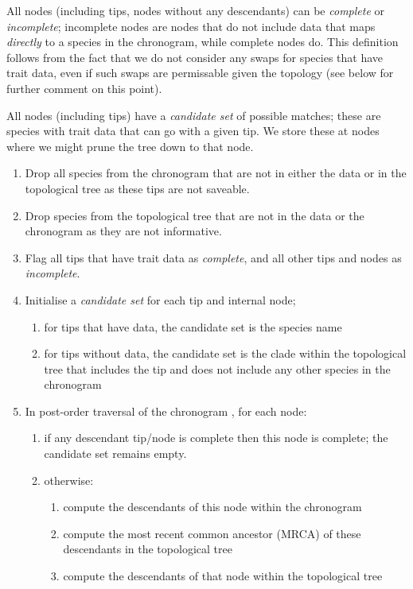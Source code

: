 \documentclass[a4paper,11pt]{article}
\begin{document}
All nodes (including tips, nodes without any descendants) can be \emph{complete} or \emph{incomplete}; incomplete nodes are nodes that do not include data that maps \emph{directly} to a species in the chronogram, while complete nodes do.  This definition follows from the fact that we do not consider any swaps for species that have trait data, even if such swaps are permissable given the topology (see below for further comment on this point).

All nodes (including tips) have a \emph{candidate set} of possible matches; these are species with trait data that can go with a given tip.  We store these at nodes where we might prune the tree down to that node.

\begin{enumerate}
\item Drop all species from the chronogram that are not in either the data or in the topological tree as these tips are not saveable.
\item Drop species from the topological tree that are not in the data or the chronogram as they are not informative.
\item Flag all tips that have trait data as \emph{complete}, and all other tips and nodes as \emph{incomplete}.
\item Initialise a \emph{candidate set} for each tip and internal node;
  \begin{enumerate}
  \item for tips that have data, the candidate set is the species name
  \item for tips without data, the candidate set is the clade within the topological tree that includes the tip and does not include any other species in the chronogram
  \end{enumerate}
\item In post-order traversal of the chronogram \citep{Felsenstein1973, Felsenstein1981}, for each node:
\begin{enumerate}
  \item if any descendant tip/node is complete then this node is complete; the candidate set remains empty.
  \item otherwise:
\begin{enumerate}
    \item compute the descendants of this node within the chronogram
    \item compute the most recent common ancestor (MRCA) of these descendants in the topological tree
    \item compute the descendants of that node within the topological tree

\end{enumerate}
\end{enumerate}
\end{enumerate}
\end{document}
